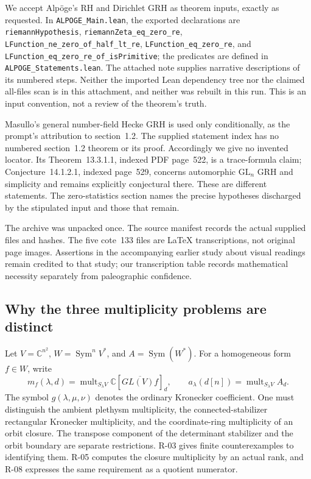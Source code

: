 We accept Alp\"oge's RH and Dirichlet GRH as theorem inputs, exactly as requested. In \texttt{ALPOGE\_Main.lean}, the exported declarations are \texttt{riemannHypothesis}, \texttt{riemannZeta\_eq\_zero\_re}, \texttt{LFunction\_ne\_zero\_of\_half\_lt\_re}, \texttt{LFunction\_eq\_zero\_re}, and \texttt{LFunction\_eq\_zero\_re\_of\_isPrimitive}; the predicates are defined in \texttt{ALPOGE\_Statements.lean}. The attached note supplies narrative descriptions of its numbered steps. Neither the imported Lean dependency tree nor the claimed all-files scan is in this attachment, and neither was rebuilt in this run. This is an input convention, not a review of the theorem's truth.

Masullo's general number-field Hecke GRH is used only conditionally, as the prompt's attribution to section~1.2. The supplied statement index has no numbered section~1.2 theorem or its proof. Accordingly we give no invented locator. Its Theorem~13.3.1.1, indexed PDF page~522, is a trace-formula claim; Conjecture~14.1.2.1, indexed page~529, concerns automorphic $\mathrm{GL}_n$ GRH and simplicity and remains explicitly conjectural there. These are different statements. The zero-statistics section names the precise hypotheses discharged by the stipulated input and those that remain.

The archive was unpacked once. The source manifest records the actual supplied files and hashes. The five cote~133 files are LaTeX transcriptions, not original page images. Assertions in the accompanying earlier study about visual readings remain credited to that study; our transcription table records mathematical necessity separately from paleographic confidence.

\subsection{Why the three multiplicity problems are distinct}

Let $V=\mathbb C^{n^2}$, $W=\operatorname{Sym}^nV^*$, and $A=\operatorname{Sym}(W^*)$. For a homogeneous form $f\in W$, write
\[
 m_f(\lambda,d)=\operatorname{mult}_{S_\lambda V}\mathbb C[\overline{GL(V)f}]_d,
 \qquad a_\lambda(d[n])=\operatorname{mult}_{S_\lambda V}A_d.
\]
The symbol $g(\lambda,\mu,\nu)$ denotes the ordinary Kronecker coefficient. One must distinguish the ambient plethysm multiplicity, the connected-stabilizer rectangular Kronecker multiplicity, and the coordinate-ring multiplicity of an orbit closure. The transpose component of the determinant stabilizer and the orbit boundary are separate restrictions. R-03 gives finite counterexamples to identifying them. R-05 computes the closure multiplicity by an actual rank, and R-08 expresses the same requirement as a quotient numerator.

